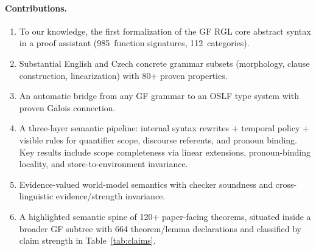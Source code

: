 \documentclass[11pt]{article}
\newcommand{\OSLF}{\textup{OSLF}}
\newcommand{\GF}{\textup{GF}}
\newcommand{\RGL}{\textup{RGL}}
\begin{document}
\paragraph{Contributions.}
\begin{enumerate}
\item To our knowledge, the first formalization of the \GF{} \RGL{} core abstract
  syntax in a proof assistant (985~function signatures, 112~categories).
\item Substantial English and Czech concrete grammar subsets (morphology,
  clause construction, linearization) with 80+ proven properties.
\item An automatic bridge from any \GF{} grammar to an \OSLF{} type system
  with proven Galois connection.
\item A three-layer semantic pipeline: internal syntax rewrites + temporal
  policy + visible rules for quantifier scope, discourse referents,
  and pronoun binding.  Key results include scope completeness via
  linear extensions, pronoun-binding locality, and store-to-environment
  invariance.
\item Evidence-valued world-model semantics with checker soundness and
  cross-linguistic evidence/strength invariance.
\item A highlighted semantic spine of 120+ paper-facing theorems,
  situated inside a broader \GF{} subtree with 664 theorem/lemma
  declarations and classified by claim strength in
  Table~\ref{tab:claims}.
\end{enumerate}
\end{document}
